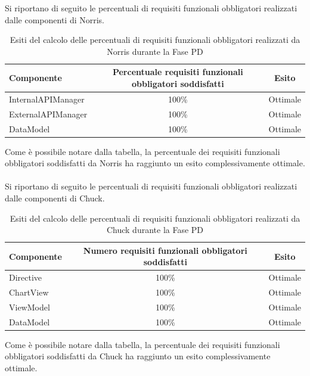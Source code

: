 				Si riportano di seguito le percentuali di requisiti funzionali obbligatori realizzati dalle componenti di Norris.
				\begin{table}[H]
					\centering
						\begin{tabu}{| l | c | c |}
							\hline
							Componente	& Percentuale requisiti funzionali obbligatori soddisfatti	& Esito		\\ \hline \hline
							InternalAPIManager	& 100\% 	& Ottimale  \\ \hline
							ExternalAPIManager  & 	100\%	& Ottimale  \\ \hline
							DataModel  & 	100\%	& Ottimale  \\ \hline
						\end{tabu}
					\caption{Esiti del calcolo delle percentuali di requisiti funzionali obbligatori realizzati da Norris durante la Fase PD}
				\end{table}
				Come è possibile notare dalla tabella, la percentuale dei requisiti funzionali obbligatori soddisfatti da Norris ha raggiunto un esito complessivamente ottimale. 
				\\ \\
				Si riportano di seguito le percentuali di requisiti funzionali obbligatori realizzati dalle componenti di Chuck.
				\begin{table}[H]
					\centering
						\begin{tabu}{| l | c | c |}
							\hline
							Componente	& Numero requisiti funzionali obbligatori soddisfatti	& Esito		\\ \hline \hline
							Directive  &	100\% 	& Ottimale  \\ \hline
							ChartView  & 	100\%	& Ottimale  \\ \hline
							ViewModel  & 	100\%	& Ottimale  \\ \hline
							DataModel  & 	100\%	& Ottimale  \\ \hline
						\end{tabu}
					\caption{Esiti del calcolo delle percentuali di requisiti funzionali obbligatori realizzati da Chuck durante la Fase PD}
				\end{table}
				Come è possibile notare dalla tabella, la percentuale dei requisiti funzionali obbligatori soddisfatti da Chuck ha raggiunto un esito complessivamente ottimale.
				\\ \\
